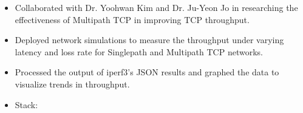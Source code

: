 \begin{itemize}
    \item Collaborated with Dr. Yoohwan Kim and Dr. Ju-Yeon Jo in researching the effectiveness of Multipath TCP in improving TCP throughput.
    \item Deployed network simulations to measure the throughput under varying latency and loss rate for Singlepath and Multipath TCP networks.
    \item Processed the output of iperf3's JSON results and graphed the data to visualize trends in throughput.
    \item Stack:    
\end{itemize}
\divider


